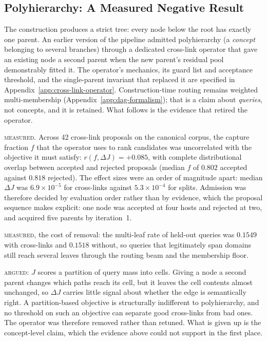 \subsection{Polyhierarchy: A Measured Negative Result}\label{sec:poly-negative}

The construction produces a strict tree: every node below the root has
exactly one parent. An earlier version of the pipeline admitted
polyhierarchy (a \emph{concept} belonging to several branches)
through a dedicated cross-link operator that gave an existing node a
second parent when the new parent's residual pool demonstrably fitted
it. The operator's mechanics, its guard list and acceptance threshold,
and the single-parent invariant that replaced it are specified in
Appendix~\ref{app:cross-link-operator}. Construction-time routing
remains weighted multi-membership (Appendix~\ref{app:dag-formalism});
that is a claim about \emph{queries}, not concepts, and it is
retained. What follows is the evidence that retired the operator.

\textsc{measured.} Across 42 cross-link proposals on the canonical
corpus, the capture fraction $f$ that the operator uses to rank
candidates was uncorrelated with the objective it must satisfy:
$r(f, \Delta J) = +0.085$, with complete distributional overlap between
accepted and rejected proposals (median $f$ of $0.802$ accepted against
$0.818$ rejected).
The effect sizes were an order of magnitude apart: median $\Delta J$
was $6.9 \times 10^{-5}$ for cross-links against $5.3 \times 10^{-4}$
for splits.
Admission was therefore decided by evaluation order rather than by
evidence, which the proposal sequence makes explicit: one node was
accepted at four hosts and rejected at two, and acquired five parents
by iteration~1.

\textsc{measured}, the cost of removal: the multi-leaf rate of
held-out queries was $0.1549$ with cross-links and $0.1518$ without,
so queries that legitimately span domains still reach several leaves
through the routing beam and the membership floor.

\textsc{argued}: $J$ scores a partition of query mass into cells.
Giving a node a second parent changes which paths reach its cell, but
it leaves the cell contents almost unchanged, so $\Delta J$ carries
little signal about whether the edge is semantically right.
A partition-based objective is structurally indifferent to
polyhierarchy, and no threshold on such an objective can separate good
cross-links from bad ones. The operator was therefore removed rather
than retuned. What is given up is the concept-level claim, which the
evidence above could not support in the first place.

